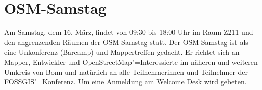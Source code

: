 \newpage
\pagestyle{cropmarksstyle}
\section*{OSM-Samstag}
\label{osm-samstag}
Am Samstag, dem 16. März, findet von 09:30 bis 18:00 Uhr im Raum Z211 und den angrenzenden Räumen der OSM-Samstag statt.
Der OSM-Samstag ist als eine Unkonferenz (Barcamp) und Mappertreffen gedacht.
Er richtet sich an Mapper, Entwickler und OpenStreetMap"=Interessierte im näheren und
weiteren Umkreis von Bonn und natürlich an alle Teilnehmerinnen und Teilnehmer der FOSSGIS"=Konferenz. Um eine Anmeldung am Welcome Desk wird gebeten.

